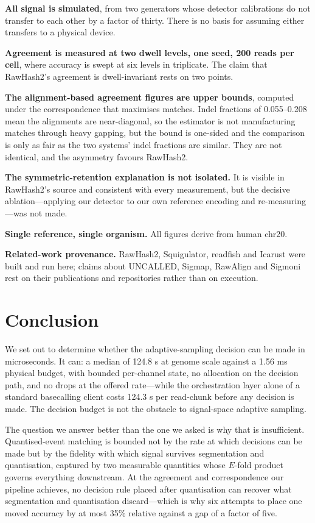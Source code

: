 \documentclass[sigconf,nonacm]{acmart}
\begin{document}
\textbf{All signal is simulated}, from two generators whose detector calibrations do not transfer
to each other by a factor of thirty. There is no basis for assuming either transfers to a
physical device.

\textbf{Agreement is measured at two dwell levels, one seed, 200 reads per cell}, where accuracy
is swept at six levels in triplicate. The claim that RawHash2's agreement is dwell-invariant
rests on two points.

\textbf{The alignment-based agreement figures are upper bounds}, computed under the
correspondence that maximises matches. Indel fractions of 0.055--0.208 mean the alignments are
near-diagonal, so the estimator is not manufacturing matches through heavy gapping, but the bound
is one-sided and the comparison is only as fair as the two systems' indel fractions are similar.
They are not identical, and the asymmetry favours RawHash2.

\textbf{The symmetric-retention explanation is not isolated.} It is visible in RawHash2's source
and consistent with every measurement, but the decisive ablation---applying our detector to our
own reference encoding and re-measuring---was not made.

\textbf{Single reference, single organism.} All figures derive from human chr20.

\textbf{Related-work provenance.} RawHash2, Squigulator, readfish and Icarust were built and run
here; claims about UNCALLED, Sigmap, RawAlign and Sigmoni rest on their publications and
repositories rather than on execution.

\section{Conclusion}

We set out to determine whether the adaptive-sampling decision can be made in microseconds. It
can: a median of 124.8 \textmu{}s at genome scale against a 1.56 ms physical budget, with bounded
per-channel state, no allocation on the decision path, and no drops at the offered rate---while
the orchestration layer alone of a standard basecalling client costs 124.3 \textmu{}s per read-chunk
before any decision is made. The decision budget is not the obstacle to signal-space adaptive
sampling.

The question we answer better than the one we asked is why that is insufficient. Quantised-event
matching is bounded not by the rate at which decisions can be made but by the fidelity with which
signal survives segmentation and quantisation, captured by two measurable quantities whose
$E$-fold product governs everything downstream. At the agreement and correspondence our pipeline
achieves, no decision rule placed after quantisation can recover what segmentation and
quantisation discard---which is why six attempts to place one moved accuracy by at most 35\%
relative against a gap of a factor of five.
\end{document}
